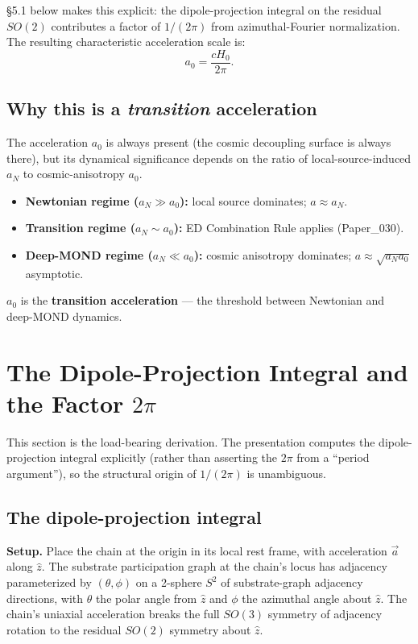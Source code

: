 \documentclass[11pt,a4paper]{article}
\begin{document}
\S5.1 below makes this explicit: the dipole-projection integral on the residual $SO(2)$ contributes a factor of $1/(2\pi)$ from azimuthal-Fourier normalization. The resulting characteristic acceleration scale is:
\[
a_0 = \frac{cH_0}{2\pi}.
\]

\subsection{Why this is a \emph{transition} acceleration}

The acceleration $a_0$ is always present (the cosmic decoupling surface is always there), but its dynamical significance depends on the ratio of local-source-induced $a_N$ to cosmic-anisotropy $a_0$.

\begin{itemize}[noitemsep]
\item \textbf{Newtonian regime ($a_N \gg a_0$):} local source dominates; $a \approx a_N$.
\item \textbf{Transition regime ($a_N \sim a_0$):} ED Combination Rule applies (Paper\_030).
\item \textbf{Deep-MOND regime ($a_N \ll a_0$):} cosmic anisotropy dominates; $a \approx \sqrt{a_N a_0}$ asymptotic.
\end{itemize}

$a_0$ is the \textbf{transition acceleration} --- the threshold between Newtonian and deep-MOND dynamics.

\section{The Dipole-Projection Integral and the Factor $2\pi$}

This section is the load-bearing derivation. The presentation computes the dipole-projection integral explicitly (rather than asserting the $2\pi$ from a ``period argument''), so the structural origin of $1/(2\pi)$ is unambiguous.

\subsection{The dipole-projection integral}

\textbf{Setup.} Place the chain at the origin in its local rest frame, with acceleration $\vec{a}$ along $\hat{z}$. The substrate participation graph at the chain's locus has adjacency parameterized by $(\theta, \phi)$ on a 2-sphere $S^2$ of substrate-graph adjacency directions, with $\theta$ the polar angle from $\hat{z}$ and $\phi$ the azimuthal angle about $\hat{z}$. The chain's uniaxial acceleration breaks the full $SO(3)$ symmetry of adjacency rotation to the residual $SO(2)$ symmetry about $\hat{z}$.
\end{document}
